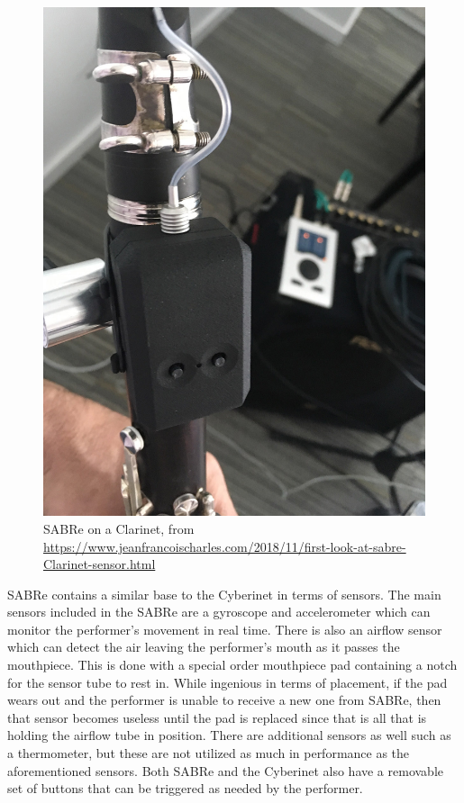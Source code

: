 \begin{figure}
    \centering
    \includegraphics[scale=0.2]{diagrams/sabre-right-hand.jpg}
    \caption{SABRe on a Clarinet, from \url{https://www.jeanfrancoischarles.com/2018/11/first-look-at-sabre-Clarinet-sensor.html}}
    \label{fig:SABRe} %
\end{figure}


SABRe contains a similar base to the Cyberinet in terms of sensors. The main sensors included in the SABRe are a gyroscope and accelerometer which can monitor the performer's movement in real time. There is also an airflow sensor which can detect the air leaving the performer's mouth as it passes the mouthpiece. This is done with a special order mouthpiece pad containing a notch for the sensor tube to rest in. While ingenious in terms of placement, if the pad wears out and the performer is unable to receive a new one from SABRe, then that sensor becomes useless until the pad is replaced since that is all that is holding the airflow tube in position. There are additional sensors as well such as a thermometer, but these are not utilized as much in performance as the aforementioned sensors. Both SABRe and the Cyberinet also have a removable set of buttons that can be triggered as needed by the performer.


